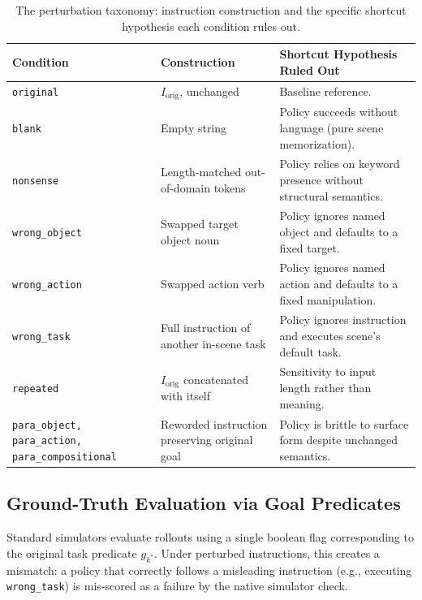 \documentclass[11pt]{article}
\begin{document}
\begin{table}[t]
    \centering
    \small
    \renewcommand{\arraystretch}{1.15}
    \begin{tabular}{@{}p{3.7cm}p{5.5cm}p{5.9cm}@{}}
        \hline
        \textbf{Condition} & \textbf{Construction} & \textbf{Shortcut Hypothesis Ruled Out} \\
        \hline
        \texttt{original} & $I_{\text{orig}}$, unchanged & Baseline reference. \\
        \texttt{blank} & Empty string & Policy succeeds without language (pure scene memorization). \\
        \texttt{nonsense} & Length-matched out-of-domain tokens & Policy relies on keyword presence without structural semantics. \\
        \texttt{wrong\_object} & Swapped target object noun & Policy ignores named object and defaults to a fixed target. \\
        \texttt{wrong\_action} & Swapped action verb & Policy ignores named action and defaults to a fixed manipulation. \\
        \texttt{wrong\_task} & Full instruction of another in-scene task & Policy ignores instruction and executes scene's default task. \\
        \texttt{repeated} & $I_{\text{orig}}$ concatenated with itself & Sensitivity to input length rather than meaning. \\
        \texttt{para\_object, para\_action,} \texttt{para\_compositional} & Reworded instruction preserving original goal & Policy is brittle to surface form despite unchanged semantics. \\
        \hline
\end{tabular}
\caption{The perturbation taxonomy: instruction construction and the specific shortcut hypothesis each condition rules out.}
\label{tab:taxonomy}
\end{table}

\subsection{Ground-Truth Evaluation via Goal Predicates}
\label{subsec:goal-predicates}

Standard simulators evaluate rollouts using a single boolean flag corresponding to the original task predicate $g_{k^*}$. Under perturbed instructions, this creates a mismatch: a policy that correctly follows a misleading instruction (e.g., executing \texttt{wrong\_task}) is mis-scored as a failure by the native simulator check.
\end{document}
